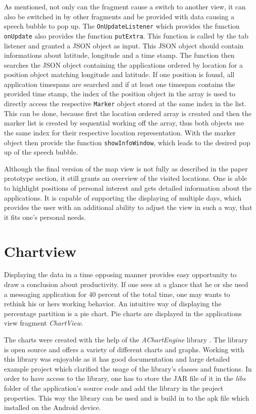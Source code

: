 As mentioned, not  only can the fragment cause a switch to another view, it can also be switched in by other fragments and be provided with data causing a speech bubble to pop up. The \lstinline$OnUpdateListener$ which provides the function \lstinline$onUpdate$ also provides the function \lstinline$putExtra$. This function is called by the tab listener and granted a JSON object as input. This JSON object should contain informations about latitude, longitude and a time stamp. The function then searches the JSON object containing the applications ordered by location for a position object matching longitude and latitude. If one position is found, all application timespans are searched and if at least one timespan contains the provided time stamp, the index of the position object in the array is used to directly access the respective \lstinline$Marker$ object stored at the same index in the list. This can be done, because first the location ordered array is created and then the marker list is created by sequential working off the array, thus both objects use the same index for their respective location representation. With the marker object then provide the function \lstinline$showInfoWindow$, which leads to the desired pop up of the speech bubble.

Although  the final version of the map view is not fully as described in the paper prototype section, it still grants an overview of the visited locations. One is able to highlight positions of personal interest and gets detailed information about the applications. It is capable of supporting the displaying of multiple days, which provides the user with an additional ability to adjust the view in such a way, that it fits one's personal needs.



\newpage
\section{Chartview}
Displaying the data in a time opposing manner provides easy opportunity to draw a conclusion about productivity. If one sees at a glance that he or she used a messaging application for 40 percent of the total time, one may wants to rethink his or hers working behavior. An intuitive way of displaying the percentage partition is a pie chart. Pie charts are displayed in the applications view fragment \emph{ChartView}.

The  charts were created with the help of the \emph{AChartEngine} library \cite{achartengine}. The library is open source and offers a variety of different charts and graphs. Working with this library was enjoyable as it has good documentation and large detailed example project which clarified the usage of the library's classes and functions. In order to have access to the library, one has to store the JAR file of it in the \emph{libs} folder of the application's source code and add the library in the project properties. This way the library can be used and is build in to the apk file which installed on the Android device.

